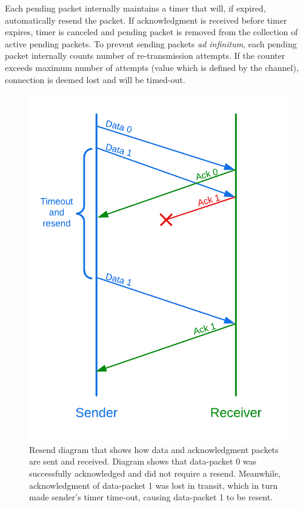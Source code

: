 \documentclass[times, utf8, diplomski]{fer}
\begin{document}
Each pending packet internally maintains a timer that will, if expired, automatically resend the packet. If acknowledgment is received before timer expires, timer is canceled and pending packet is removed from the collection of active pending packets. To prevent sending packets \textit{ad infinitum}, each pending packet internally counts number of re-transmission attempts. If the counter exceeds maximum number of attempts (value which is defined by the channel), connection is deemed lost and will be timed-out. \\

\begin{figure}[H]
	\centering
	\includegraphics[scale=0.3]{Resend-diagram}
	\caption{Resend diagram that shows how data and acknowledgment packets are sent and received. Diagram shows that data-packet 0 was successfully acknowledged and did not require a resend. Meanwhile, acknowledgment of data-packet 1 was lost in transit, which in turn made sender's timer time-out, causing data-packet 1 to be resent.}
\end{figure}
\end{document}
